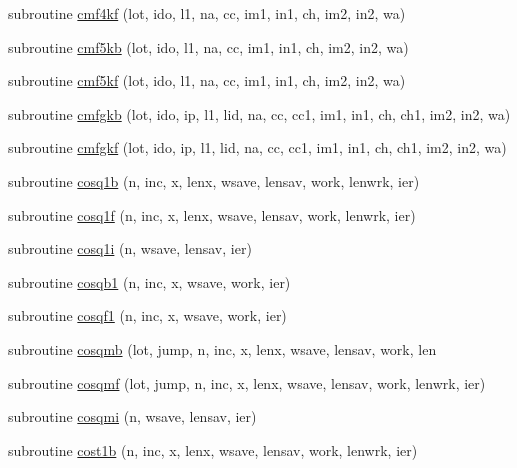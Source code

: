 \begin{DoxyCompactItemize}
\item 
subroutine \mbox{\hyperlink{namespacefftclass_acdd67c6a77ecec55c036ab8899c07dee}{cmf4kf}} (lot, ido, l1, na, cc, im1, in1, ch, im2, in2, wa)
\item 
subroutine \mbox{\hyperlink{namespacefftclass_a4bf0caaf1c5caeb50490706cd35d82c5}{cmf5kb}} (lot, ido, l1, na, cc, im1, in1, ch, im2, in2, wa)
\item 
subroutine \mbox{\hyperlink{namespacefftclass_a59cb57b66516dd0b08cf36e366933c56}{cmf5kf}} (lot, ido, l1, na, cc, im1, in1, ch, im2, in2, wa)
\item 
subroutine \mbox{\hyperlink{namespacefftclass_ab1c60a144232626a03fad4dd30f88d7d}{cmfgkb}} (lot, ido, ip, l1, lid, na, cc, cc1, im1, in1, ch, ch1, im2, in2, wa)
\item 
subroutine \mbox{\hyperlink{namespacefftclass_a317b5c8887b5c2ecb7e518f0c7058589}{cmfgkf}} (lot, ido, ip, l1, lid, na, cc, cc1, im1, in1, ch, ch1, im2, in2, wa)
\item 
subroutine \mbox{\hyperlink{namespacefftclass_a6684b378360642f160b255df6b3aa0bd}{cosq1b}} (n, inc, x, lenx, wsave, lensav, work, lenwrk, ier)
\item 
subroutine \mbox{\hyperlink{namespacefftclass_a546e80f6eb00444bf4508ae26186e0d2}{cosq1f}} (n, inc, x, lenx, wsave, lensav, work, lenwrk, ier)
\item 
subroutine \mbox{\hyperlink{namespacefftclass_ab281b0d26ef5d825f00696ab35e18e65}{cosq1i}} (n, wsave, lensav, ier)
\item 
subroutine \mbox{\hyperlink{namespacefftclass_a4f908baf4cda5a6be5b71eb85fc9309c}{cosqb1}} (n, inc, x, wsave, work, ier)
\item 
subroutine \mbox{\hyperlink{namespacefftclass_a894b76f80148bf5d923d558356a6cc1a}{cosqf1}} (n, inc, x, wsave, work, ier)
\item 
subroutine \mbox{\hyperlink{namespacefftclass_a766146700483880896edee5e866f29a6}{cosqmb}} (lot, jump, n, inc, x, lenx, wsave, lensav, work, len
\item 
subroutine \mbox{\hyperlink{namespacefftclass_a48467d0cccf9f7f93786f4997fe714f5}{cosqmf}} (lot, jump, n, inc, x, lenx, wsave, lensav, work, lenwrk, ier)
\item 
subroutine \mbox{\hyperlink{namespacefftclass_a9851ac46e48072ac6c85e3c574a10dc5}{cosqmi}} (n, wsave, lensav, ier)
\item 
subroutine \mbox{\hyperlink{namespacefftclass_a2bdaaab2b5d3130f8339f9463daa6db9}{cost1b}} (n, inc, x, lenx, wsave, lensav, work, lenwrk, ier)
\item 

\end{DoxyCompactItemize}

